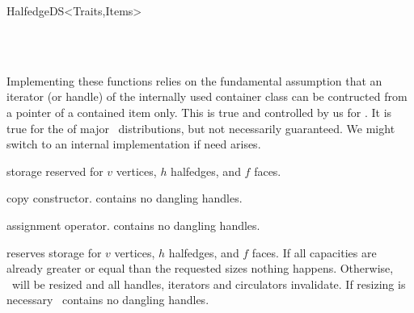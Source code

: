 \begin{ccRefConcept}{HalfedgeDS<Traits,Items>}
\begin{ccAdvanced}
\mbox{}~~~~~~ \\
\mbox{}~~~~~~

Implementing these functions relies on the fundamental assumption that
an iterator (or handle) of the internally used container class can be
contructed from a pointer of a contained item only. This is true and
controlled by us for . It is true for the
 of major \stl\ distributions, but not necessarily 
guaranteed. We might switch to an internal implementation if need
arises.

\ccGlue
{}

\ccGlue
{}

\ccGlue
{}

\end{ccAdvanced}

\ccCreation
{}
\ccThreeToTwo


    {storage reserved for $v$ vertices, $h$ halfedges, and $f$ faces.}

\ccTagDefaults
{}
    {copy constructor. \ccPrecond {} contains no dangling handles.}

    {assignment operator. \ccPrecond {} contains no dangling handles.}

    {reserves storage for $v$ vertices, $h$ halfedges, and $f$ faces.
     If all capacities are already greater or equal than the requested sizes
     nothing happens. Otherwise, \ccVar\ will be resized and all handles, 
     iterators and circulators invalidate. \ccPrecond If resizing is
     necessary \ccVar\ contains no dangling handles.}



\end{ccRefConcept}
